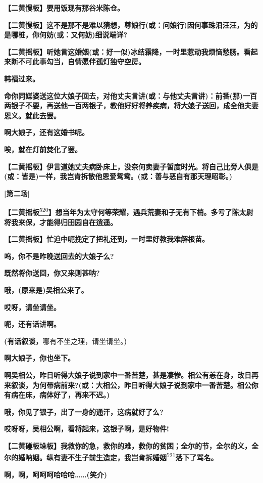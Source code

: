 \textbf{【二黄慢板】要用饭现有那谷米陈仓。}

\textbf{【二黄慢板】这不是那不是难以猜想，尊娘行(或：问娘行)因何事珠泪汪汪，为的是哪桩，你何妨(或：又何妨)细说端详?}

\textbf{【二黄摇板】听她言这婚姻(或：好一似)冰结霜降，一时里惹动我烦恼愁肠。看起来断不可此事勾当，自情愿伴孤灯独守空房。}

\textbf{韩福过来。}

\textbf{命你同媒婆送这位大娘子回去，对他丈夫言讲(或：与他丈夫言讲)：前番(那)一百两银子不要，再送他一百两银子，教他好好将养疾病，将大娘子送回，成全他夫妻恩义。就此去罢。}

\textbf{啊大娘子，还有这婚书呢。}

\textbf{唉，就在灯前焚化了罢。}

\textbf{【二黄摇板】伊言道她丈夫病卧床上，没奈何卖妻子暂度时光。将自己比旁人俱是(或：皆是)一样，我岂肯拆散他恩爱鸳鸯。(或：善与恶自有那天理昭彰。)}

\textbf{{[}第二场{]}}

\textbf{【二黄摇板}\protect\hyperlink{fn520}{\textsuperscript{520}}\textbf{】想当年为太守何等荣耀，遇兵荒妻和子无有下梢。多亏了陈太尉将我来保，才能得归田园自在逍遥。}

\textbf{【二黄摇板】忙迫中呃挽定了把礼还到，一时里好教我难解根苗。}

\textbf{呜，你不是昨晚送回去的大娘子么?}

\textbf{既然将你送回，你又来则甚呐?}

\textbf{哦，(原来是)吴相公来了。}

\textbf{哎呀，请坐请坐。}

\textbf{呃，还有话讲啊。}

\textbf{(有话叙谈，}哪有不坐之理，请坐请坐。\textbf{)}

\textbf{啊大娘子，你也坐下。}

\textbf{啊吴相公，昨日听得大娘子说到家中一番苦楚，甚是凄惨。相公有恙在身，改日再来叙谈，为何带病前来?(或：大相公，昨日听得大娘子说到家中一番苦楚。相公你有病在床，病体好了，再来不迟。)}

\textbf{哦，你见了银子，出了一身的通汗，这病就好了么?}

\textbf{哎呀呀，吴相公啊，看将起来，这银子啊，是好物件!}

\textbf{【二黄碰板垛板】我救你的急，救你的难，救你的贫困；全尔的节，全尔的义，全尔的婚呐姻。纵有妻不生子前生造定，我岂肯拆婚姻}\protect\hyperlink{fn521}{\textsuperscript{521}}\textbf{落下了骂名。}

\textbf{啊，啊，呵呵呵哈哈哈\ldots{}\ldots{}(笑介)}

